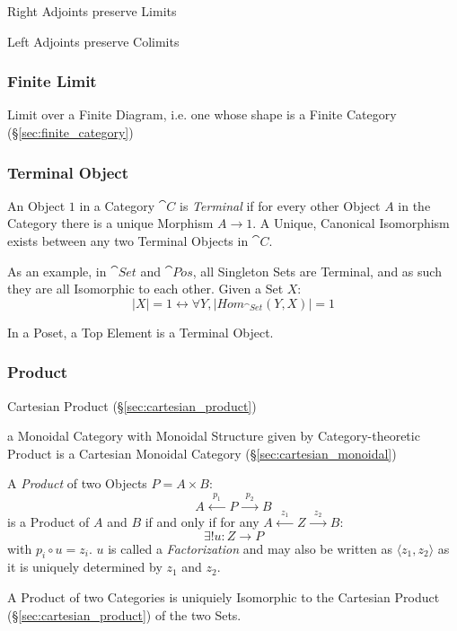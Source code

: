 Right Adjoints preserve Limits

Left Adjoints preserve Colimits



\subsubsection{Finite Limit}\label{sec:finite_limit}

Limit over a Finite Diagram, i.e. one whose shape is a Finite Category
(\S\ref{sec:finite_category})



\subsubsection{Terminal Object}\label{sec:terminal_object}

An Object $1$ in a Category $\cat{C}$ is \emph{Terminal} if for
every other Object $A$ in the Category there is a unique Morphism $A
\rightarrow 1$. A Unique, Canonical Isomorphism exists between any two
Terminal Objects in $\cat{C}$.

As an example, in $\cat{Set}$ and $\cat{Pos}$, all Singleton
Sets are Terminal, and as such they are all Isomorphic to each other.
Given a Set $X$:
\[
  |X| = 1 \leftrightarrow \forall Y, |Hom_{\cat{Set}}(Y,X)| = 1
\]

In a Poset, a Top Element is a Terminal Object.



\subsubsection{Product}\label{sec:product}

\fist Cartesian Product (\S\ref{sec:cartesian_product})

a Monoidal Category with Monoidal Structure given by Category-theoretic Product
is a Cartesian Monoidal Category (\S\ref{sec:cartesian_monoidal})

A \emph{Product} of two Objects $P = A \times B$:
\[
  A \xleftarrow{\;\;p_1\;\;} P \xrightarrow{\;\;p_2\;\;} B
\]
is a Product of $A$ and $B$ if and only if for any $A
\xleftarrow{\;\;z_1\;\;} Z \xrightarrow{\;\;z_2\;\;} B$:
\[
  \exists!u : Z \rightarrow P
\]
with $p_i \circ u = z_i$. $u$ is called a \emph{Factorization} and may
also be written as $\langle z_1, z_2 \rangle$ as it is uniquely
determined by $z_1$ and $z_2$.

A Product of two Categories is uniquiely Isomorphic to the Cartesian
Product (\S\ref{sec:cartesian_product}) of the two Sets.

